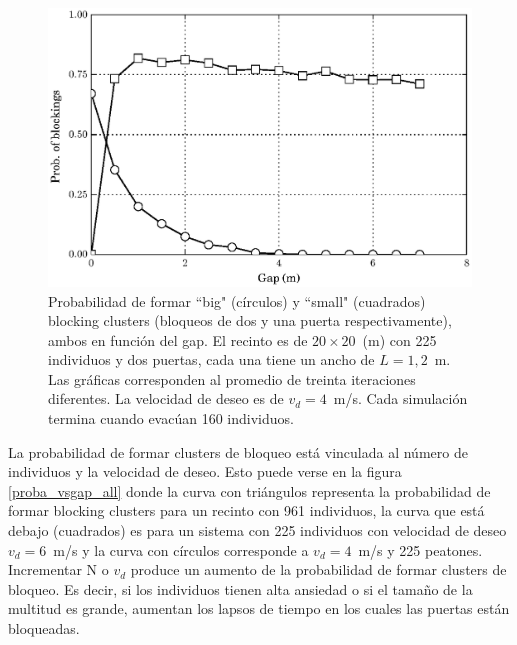\begin{figure}[H]
    \centering
    \includegraphics[scale=1.6]{figuras/proba_vsgap_v4_big_small.eps}
    \caption[width=5cm]{Probabilidad de formar ``big" (círculos) y ``small" (cuadrados) blocking clusters (bloqueos de dos y una puerta respectivamente), ambos en función del gap. El recinto es de $20\times 20$~(m) con 225 individuos y dos puertas, cada una tiene un ancho de $L=1,2$~m. Las gráficas corresponden al promedio de treinta iteraciones diferentes. La velocidad de deseo es de $v_d=4$~m/s. Cada simulación termina cuando evacúan 160 individuos.}
    \label{proba_vsgap_v4_big_small}
\end{figure}

La probabilidad de formar clusters de bloqueo está vinculada al número de individuos y la velocidad de deseo. Esto puede verse en la figura \ref{proba_vsgap_all} donde la curva con triángulos representa la probabilidad de formar blocking clusters para un recinto con 961 individuos, la curva que está debajo (cuadrados) es para un sistema con 225 individuos con velocidad de deseo $v_d=6$~m/s y la curva con círculos corresponde a $v_d=4$~m/s y 225 peatones. Incrementar N o $v_d$ produce un aumento de la probabilidad de formar clusters de bloqueo. Es decir, si los individuos tienen alta ansiedad o si el tamaño de la multitud es grande, aumentan los lapsos de tiempo en los cuales las puertas están bloqueadas.  

